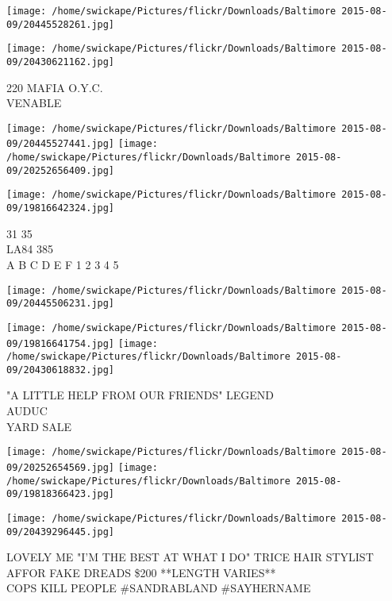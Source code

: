 \documentclass[10pt,letterpaper]{article}
\begin{document}
\texttt{[image: /home/swickape/Pictures/flickr/Downloads/Baltimore 2015-08-09/20445528261.jpg]}

\vspace{0.25in}
\texttt{[image: /home/swickape/Pictures/flickr/Downloads/Baltimore 2015-08-09/20430621162.jpg]}

220 MAFIA O.Y.C.\\
VENABLE\\
\pagebreak

\texttt{[image: /home/swickape/Pictures/flickr/Downloads/Baltimore 2015-08-09/20445527441.jpg]}
\texttt{[image: /home/swickape/Pictures/flickr/Downloads/Baltimore 2015-08-09/20252656409.jpg]}

\texttt{[image: /home/swickape/Pictures/flickr/Downloads/Baltimore 2015-08-09/19816642324.jpg]}

31 35\\
LA84 385\\
A B C D E F 1 2 3 4 5\\
\pagebreak

\texttt{[image: /home/swickape/Pictures/flickr/Downloads/Baltimore 2015-08-09/20445506231.jpg]}

\vspace{0.25in}
\texttt{[image: /home/swickape/Pictures/flickr/Downloads/Baltimore 2015-08-09/19816641754.jpg]}
\texttt{[image: /home/swickape/Pictures/flickr/Downloads/Baltimore 2015-08-09/20430618832.jpg]}

"A LITTLE HELP FROM OUR FRIENDS" LEGEND\\
AUDUC\\
YARD SALE\\
\pagebreak

\texttt{[image: /home/swickape/Pictures/flickr/Downloads/Baltimore 2015-08-09/20252654569.jpg]}
\texttt{[image: /home/swickape/Pictures/flickr/Downloads/Baltimore 2015-08-09/19818366423.jpg]}

\vspace{0.25in}
\texttt{[image: /home/swickape/Pictures/flickr/Downloads/Baltimore 2015-08-09/20439296445.jpg]}

LOVELY ME "I'M THE BEST AT WHAT I DO" TRICE HAIR STYLIST\\
AFFOR FAKE DREADS \$200 **LENGTH VARIES**\\
COPS KILL PEOPLE \#SANDRABLAND \#SAYHERNAME\\
\pagebreak
\end{document}
